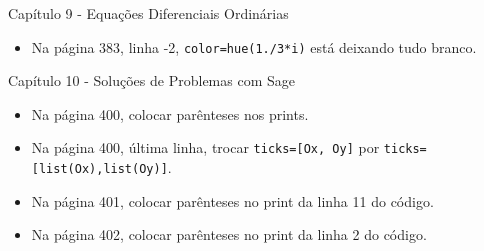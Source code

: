 \documentclass[10pt,a4paper]{report}
\begin{document}
\vspace{1cm}
\noindent
{\large Capítulo 9 - Equações Diferenciais Ordinárias}


\begin{itemize}



\item Na página 383, linha -2, \verb|color=hue(1./3*i)| está deixando tudo branco.

\end{itemize}


\vspace{1cm}
\noindent
{\large Capítulo 10 - Soluções de Problemas com Sage}


\begin{itemize}
 \item Na página 400, colocar parênteses nos prints. 
 \item Na página 400, última linha, trocar \verb|ticks=[Ox, Oy]| por \verb|ticks=[list(Ox),list(Oy)]|.
 \item Na página 401, colocar parênteses no print da linha 11 do código. 
 \item Na página 402, colocar parênteses no print da linha 2 do código. 
\end{itemize}



% 
% 


% 
% 
% 
% 
% 
\end{document}
